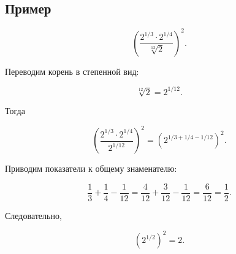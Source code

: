 \documentclass[a4paper,12pt]{article}
\begin{document}
\subsection*{Пример}

\[
\left(
\frac{2^{1/3}\cdot2^{1/4}}
{\sqrt[12]{2}}
\right)^2.
\]

Переводим корень в степенной вид:

\[
\sqrt[12]{2}=2^{1/12}.
\]

Тогда

\[
\left(
\frac{2^{1/3}\cdot2^{1/4}}
{2^{1/12}}
\right)^2
=
\left(
2^{1/3+1/4-1/12}
\right)^2.
\]

Приводим показатели к общему знаменателю:

\[
\frac13+\frac14-\frac1{12}
=
\frac4{12}+\frac3{12}-\frac1{12}
=
\frac6{12}
=
\frac12.
\]

Следовательно,

\[
\left(2^{1/2}\right)^2=2.
\]


\clearpage
\pagestyle{empty}
\end{document}
